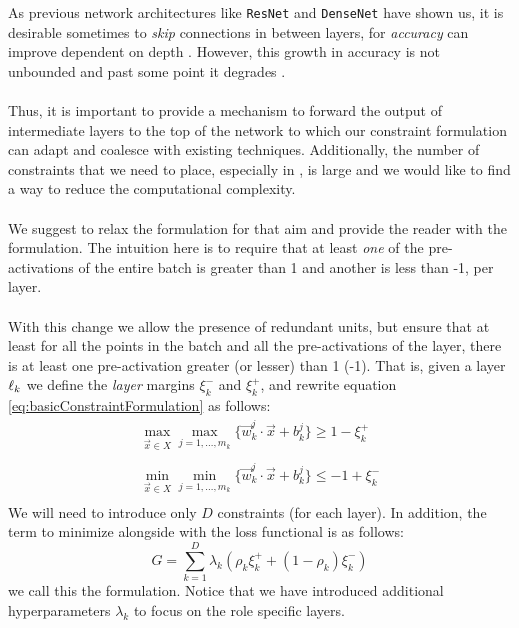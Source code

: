 As previous network architectures like \texttt{ResNet} and \texttt{DenseNet} have shown us, it is desirable sometimes to \emph{skip} connections in between layers, for \emph{accuracy} can improve dependent on depth \cite{resnet, densenet}. However, this growth in accuracy is not unbounded and past some point it degrades \cite{simpnet}. 
\\\\
Thus, it is important to provide a mechanism to forward the output of intermediate layers to the top of the network to which our constraint formulation can adapt and coalesce with existing techniques. Additionally, the number of constraints that we need to place, especially in \SepUnitPoint, is large and we would like to find a way to reduce the computational complexity.
\\\\
We suggest to relax the \SepUnit formulation for that aim and provide the reader with the \SepLayer formulation. The intuition here is to require that at least \emph{one} of the pre-activations of the entire batch is greater than 1 and another is less than -1, per layer.  
\\\\
With this change we allow the presence of redundant units, but ensure that at least for all the points in the batch and all the pre-activations of the layer, there is at least one pre-activation greater (or lesser) than 1 (-1). That is, given a layer $\ell_k$ we define the \emph{layer} margins $\xi^{-}_k$ and $\xi^{+}_k$, and rewrite equation \ref{eq:basicConstraintFormulation} as follows:
\begin{equation}\label{eq:layerSeparationConstraint}
\begin{array}{lcl}
    \displaystyle\max_{\vec{x}\in{X}}\max_{j=1,\ldots,m_k}\{\vec{w}^j_k\cdot\vec{x}+b^j_k\}\geq 1-\xi^{+}_k\\\\
    \displaystyle\min_{\vec{x}\in{X}}\min_{j=1,\ldots,m_k}\{\vec{w}^j_k\cdot\vec{x}+b^j_k\}\leq -1+\xi^{-}_k\\
\end{array}    
\end{equation}
We will need to introduce only $D$ constraints (for each layer). In addition, the term to minimize alongside with the loss functional is as follows:
\begin{equation}\label{eq:constraintLossForLayerSeparation}
    G = \sum_{k=1}^{D}\lambda_k(\rho_{k}\xi^{+}_{k}+(1-\rho_{k})\xi^{-}_{k})
\end{equation}
we call this the \SepLayer formulation. Notice that we have introduced additional hyperparameters $\lambda_k$ to focus on the role specific layers.   


